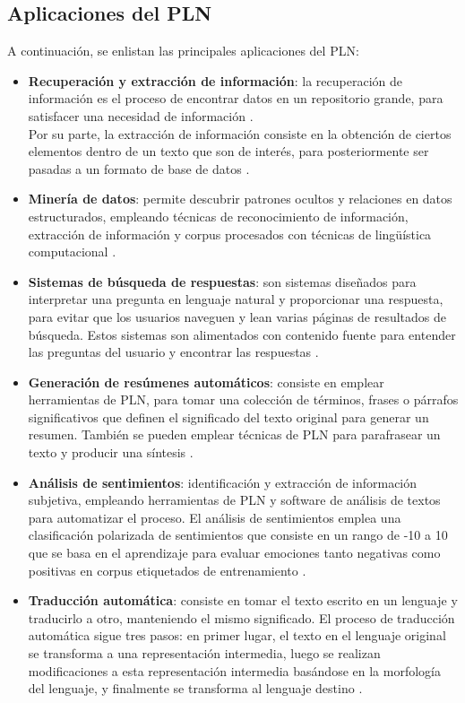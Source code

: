 \subsection{Aplicaciones del PLN}
A continuación, se enlistan las principales aplicaciones del PLN:
\begin{itemize}
    \item \textbf{Recuperación y extracción de información}: la recuperación de información es el proceso de encontrar datos en un repositorio grande, para satisfacer una necesidad de información \cite{ref48}.\\ 
    Por su parte, la extracción de información consiste en la obtención de ciertos elementos dentro de un texto que son de interés, para posteriormente ser pasadas a un formato de base de datos \cite{ref48}.    
    \item \textbf{Minería de datos}: permite descubrir patrones ocultos y relaciones en datos estructurados, empleando técnicas de reconocimiento de información, extracción de información y corpus procesados con técnicas de lingüística computacional \cite{ref48}.
    \item \textbf{Sistemas de búsqueda de respuestas}: son sistemas diseñados para interpretar una pregunta en lenguaje natural y proporcionar una respuesta, para evitar que los usuarios naveguen y lean varias páginas de resultados de búsqueda. Estos sistemas son alimentados con contenido fuente para entender las preguntas del usuario y encontrar las respuestas \cite{ref48}.
    \item \textbf{Generación de resúmenes automáticos}: consiste en emplear herramientas de PLN, para tomar una colección de términos, frases o párrafos significativos que definen el significado del texto original para generar un resumen. También se pueden emplear técnicas de PLN para parafrasear un texto y producir una síntesis \cite{ref48}.
    \item \textbf{Análisis de sentimientos}: identificación y extracción de información subjetiva, empleando herramientas de PLN y software de análisis de textos para automatizar el proceso. El análisis de sentimientos emplea una clasificación polarizada de sentimientos que consiste en un rango de -10 a 10 que se basa en el aprendizaje para evaluar emociones tanto negativas como positivas en corpus etiquetados de entrenamiento \cite{ref48}.
    \item \textbf{Traducción automática}: consiste en tomar el texto escrito en un lenguaje y traducirlo a otro, manteniendo el mismo significado. El proceso de traducción automática sigue tres pasos: en primer lugar, el texto en el lenguaje original se transforma a una representación intermedia, luego se realizan modificaciones a esta representación intermedia basándose en la morfología del lenguaje, y finalmente se transforma al lenguaje destino \cite{ref48}.
\end{itemize}

